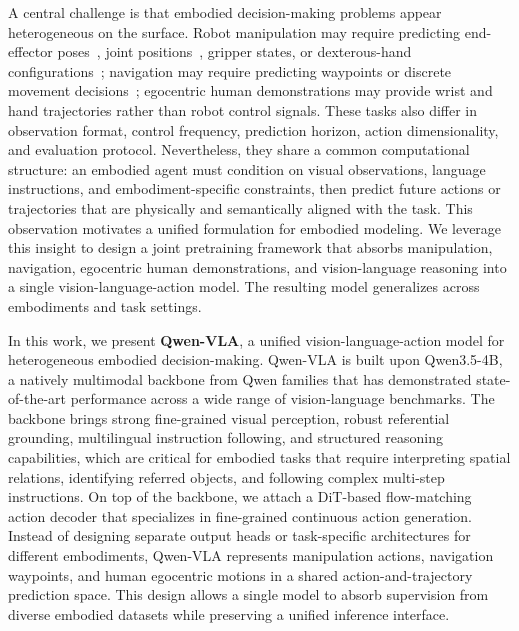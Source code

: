 \documentclass{article}
\begin{document}
A central challenge is that embodied decision-making problems appear heterogeneous on the surface. Robot manipulation may require predicting end-effector poses~\citep{black2024pi0,zheng2025x,zhang2026vlm4vla}, joint positions~\citep{fu2024mobile,nvidia2025gr00t}, gripper states, or dexterous-hand configurations~\citep{luo2025beingh0}; navigation may require predicting waypoints or discrete movement decisions~\citep{navfom,wang2025trackvla,wei2025streamvln}; egocentric human demonstrations may provide wrist and hand trajectories rather than robot control signals. These tasks also differ in observation format, control frequency, prediction horizon, action dimensionality, and evaluation protocol. Nevertheless, they share a common computational structure: an embodied agent must condition on visual observations, language instructions, and embodiment-specific constraints, then predict future actions or trajectories that are physically and semantically aligned with the task. This observation motivates a unified formulation for embodied modeling.
%
We leverage this insight to design a joint pretraining framework that absorbs manipulation, navigation, egocentric human demonstrations, and vision-language reasoning into a single vision-language-action model. The resulting model generalizes across embodiments and task settings.




  
In this work, we present \textbf{Qwen-VLA}, a unified vision-language-action model for heterogeneous embodied decision-making. 
Qwen-VLA is built upon Qwen3.5-4B, a natively multimodal backbone from Qwen families that has demonstrated state-of-the-art performance across a wide range of vision-language benchmarks. The backbone brings strong fine-grained visual perception, robust referential grounding, multilingual instruction following, and structured reasoning capabilities, which are critical for embodied tasks that require interpreting spatial relations, identifying referred objects, and following complex multi-step instructions.
On top of the backbone, we attach a DiT-based flow-matching action decoder that specializes in fine-grained continuous action generation. Instead of designing separate output heads or task-specific architectures for different embodiments, Qwen-VLA represents manipulation actions, navigation waypoints, and human egocentric motions in a shared action-and-trajectory prediction space. This design allows a single model to absorb supervision from diverse embodied datasets while preserving a unified inference interface.
\end{document}
